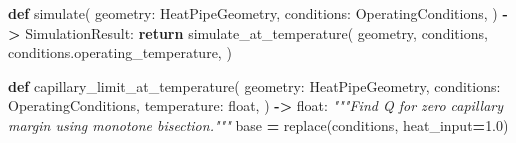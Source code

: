 \documentclass[
  12pt,a4paper,oneside]{report}
\newenvironment{Shaded}{\begin{snugshade}}{\end{snugshade}}
\newcommand{\BuiltInTok}[1]{#1}
\newcommand{\CommentTok}[1]{\textcolor[rgb]{0.56,0.35,0.01}{\textit{#1}}}
\newcommand{\ControlFlowTok}[1]{\textcolor[rgb]{0.13,0.29,0.53}{\textbf{#1}}}
\newcommand{\FloatTok}[1]{\textcolor[rgb]{0.00,0.00,0.81}{#1}}
\newcommand{\KeywordTok}[1]{\textcolor[rgb]{0.13,0.29,0.53}{\textbf{#1}}}
\newcommand{\NormalTok}[1]{#1}
\newcommand{\OperatorTok}[1]{\textcolor[rgb]{0.81,0.36,0.00}{\textbf{#1}}}
\begin{document}
\begin{Shaded}
\begin{Highlighting}[]
\KeywordTok{def}\NormalTok{ simulate(}
\NormalTok{    geometry: HeatPipeGeometry, conditions: OperatingConditions,}
\NormalTok{) }\OperatorTok{{-}\textgreater{}}\NormalTok{ SimulationResult:}
    \ControlFlowTok{return}\NormalTok{ simulate\_at\_temperature(}
\NormalTok{        geometry, conditions, conditions.operating\_temperature,}
\NormalTok{    )}


\KeywordTok{def}\NormalTok{ capillary\_limit\_at\_temperature(}
\NormalTok{    geometry: HeatPipeGeometry,}
\NormalTok{    conditions: OperatingConditions,}
\NormalTok{    temperature: }\BuiltInTok{float}\NormalTok{,}
\NormalTok{) }\OperatorTok{{-}\textgreater{}} \BuiltInTok{float}\NormalTok{:}
    \CommentTok{"""Find Q for zero capillary margin using monotone bisection."""}
\NormalTok{    base }\OperatorTok{=}\NormalTok{ replace(conditions, heat\_input}\OperatorTok{=}\FloatTok{1.0}\NormalTok{)}


\end{Highlighting}
\end{Shaded}
\end{document}
